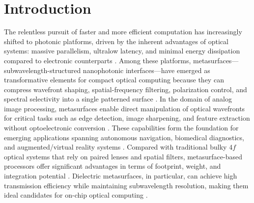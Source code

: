 \section{Introduction}

The relentless pursuit of faster and more efficient computation has increasingly shifted to photonic platforms, driven by the inherent advantages of optical systems: massive parallelism, ultralow latency, and minimal energy dissipation compared to electronic counterparts \cite{shastri2021photonics,prucnal2016recent,wetzstein2020inference}. Among these platforms, metasurfaces---subwavelength-structured nanophotonic interfaces---have emerged as transformative elements for compact optical computing because they can compress wavefront shaping, spatial-frequency filtering, polarization control, and spectral selectivity into a single patterned surface \cite{yu2014,koenderink2015,genevet2017,kamali2018review,chen2022review}. In the domain of analog image processing, metasurfaces enable direct manipulation of optical wavefronts for critical tasks such as edge detection, image sharpening, and feature extraction without optoelectronic conversion \cite{silva2014,zhu2017,guo2018laplace,kwon2018,cordaro2019}. These capabilities form the foundation for emerging applications spanning autonomous navigation, biomedical diagnostics, and augmented/virtual reality systems \cite{wang2020metasurface,zhou2022flat}. Compared with traditional bulky $4f$ optical systems that rely on paired lenses and spatial filters, metasurface-based processors offer significant advantages in terms of footprint, weight, and integration potential \cite{goodman2017,bykov2018optica}. Dielectric metasurfaces, in particular, can achieve high transmission efficiency while maintaining subwavelength resolution, making them ideal candidates for on-chip optical computing \cite{decker2015high,west2014all}.

